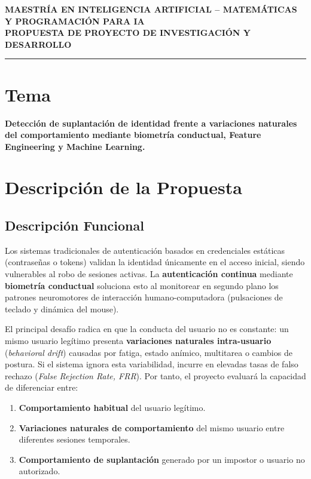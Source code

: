 \documentclass[10pt,letterpaper]{article}
\begin{document}
\begin{center}
    {\small\textbf{\color{primary}MAESTRÍA EN INTELIGENCIA ARTIFICIAL -- MATEMÁTICAS Y PROGRAMACIÓN PARA IA}}\\[1.5pt]
    {\Large\textbf{PROPUESTA DE PROYECTO DE INVESTIGACIÓN Y DESARROLLO}}\\[2.5pt]
    {\color{primary}\rule{\textwidth}{1.0pt}}
\end{center}

\vspace{-6pt}

\section{Tema}
\textbf{Detección de suplantación de identidad frente a variaciones naturales del comportamiento mediante biometría conductual, Feature Engineering y Machine Learning.}

\section{Descripción de la Propuesta}

\subsection{Descripción Funcional}
Los sistemas tradicionales de autenticación basados en credenciales estáticas (contraseñas o tokens) validan la identidad únicamente en el acceso inicial, siendo vulnerables al robo de sesiones activas. La \textbf{autenticación continua} mediante \textbf{biometría conductual} soluciona esto al monitorear en segundo plano los patrones neuromotores de interacción humano-computadora (pulsaciones de teclado y dinámica del mouse).

El principal desafío radica en que la conducta del usuario no es constante: un mismo usuario legítimo presenta \textbf{variaciones naturales intra-usuario} (\textit{behavioral drift}) causadas por fatiga, estado anímico, multitarea o cambios de postura. Si el sistema ignora esta variabilidad, incurre en elevadas tasas de falso rechazo (\textit{False Rejection Rate, FRR}). Por tanto, el proyecto evaluará la capacidad de diferenciar entre:
\begin{enumerate}
    \item \textbf{Comportamiento habitual} del usuario legítimo.
    \item \textbf{Variaciones naturales de comportamiento} del mismo usuario entre diferentes sesiones temporales.
    \item \textbf{Comportamiento de suplantación} generado por un impostor o usuario no autorizado.
\end{enumerate}
\end{document}
